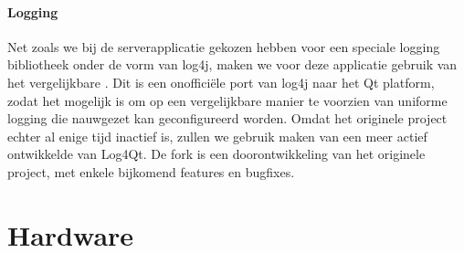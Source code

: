 \subsubsection{Logging}

Net zoals we bij de serverapplicatie gekozen hebben voor een speciale logging bibliotheek onder de vorm van log4j, maken we voor deze applicatie gebruik van het vergelijkbare . Dit is een onofficiële port van log4j naar het Qt platform, zodat het mogelijk is om op een vergelijkbare manier te voorzien van uniforme logging die nauwgezet kan geconfigureerd worden. Omdat het originele project echter al enige tijd inactief is, zullen we gebruik maken van een meer actief ontwikkelde  van Log4Qt. De fork is een doorontwikkeling van het originele project, met enkele bijkomend features en bugfixes.


%
%

\chapter{Hardware}
\label{chap:hardware}
